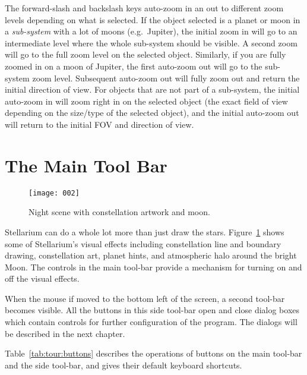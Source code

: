 The forward-slash \key{/} and backslash \key{\textbackslash} keys auto-zoom in an out to different
zoom levels depending on what is selected. If the object selected is a planet
or moon in a \emph{sub-system} with a lot of moons (e.g.\ Jupiter), the
initial zoom in will go to an intermediate level where the whole
sub-system should be visible. A second zoom will go to the full zoom
level on the selected object. Similarly, if you are fully zoomed in on a
moon of Jupiter, the first auto-zoom out will go to the sub-system zoom
level. Subsequent auto-zoom out will fully zoom out and return the
initial direction of view. For objects that are not part of a
sub-system, the initial auto-zoom in will zoom right in on the selected
object (the exact field of view depending on the size/type of the
selected object), and the initial auto-zoom out will return to the
initial FOV and direction of view.

\section{The Main Tool Bar}
\label{sec:tour:toolbar}

\begin{figure}[htb]
\centering\texttt{[image: 002]}
\caption{Night scene with constellation artwork and moon.}
\label{fig:002}
\end{figure}

Stellarium can do a whole lot more than just draw the stars. Figure~\ref{fig:002}
shows some of Stellarium's visual effects including constellation
line and boundary drawing, constellation art, planet hints, and
atmospheric halo around the bright Moon. The controls in the main tool-bar
provide a mechanism for turning on and off the visual effects.

When the mouse if moved to the bottom left of the screen, a second
tool-bar becomes visible. All the buttons in this side tool-bar open
and close dialog boxes which contain controls for further
configuration of the program. The dialogs will be described in the
next chapter.


Table~\ref{tab:tour:buttons} describes the operations of buttons
on the main tool-bar and the side tool-bar, and gives their default
keyboard shortcuts.

